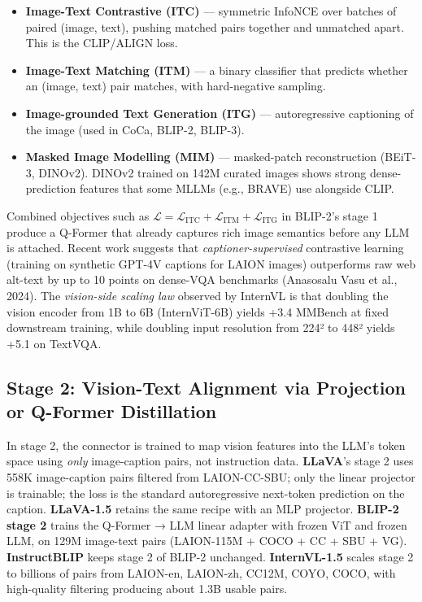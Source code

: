 \documentclass{article}
\begin{document}
\begin{itemize}

\item
  \textbf{Image-Text Contrastive (ITC)} --- symmetric InfoNCE over batches of paired (image, text), pushing matched pairs together and unmatched apart. This is the CLIP/ALIGN loss.
\item
  \textbf{Image-Text Matching (ITM)} --- a binary classifier that predicts whether an (image, text) pair matches, with hard-negative sampling.
\item
  \textbf{Image-grounded Text Generation (ITG)} --- autoregressive captioning of the image (used in CoCa, BLIP-2, BLIP-3).
\item
  \textbf{Masked Image Modelling (MIM)} --- masked-patch reconstruction (BEiT-3, DINOv2). DINOv2 \citep{oquab20232023} trained on 142M curated images shows strong dense-prediction features that some MLLMs (e.g., BRAVE) use alongside CLIP.
\end{itemize}

Combined objectives such as \(\mathcal{L} = \mathcal{L}_{\text{ITC}} + \mathcal{L}_{\text{ITM}} + \mathcal{L}_{\text{ITG}}\) in BLIP-2's stage 1 produce a Q-Former that already captures rich image semantics before any LLM is attached. Recent work suggests that \emph{captioner-supervised} contrastive learning (training on synthetic GPT-4V captions for LAION images) outperforms raw web alt-text by up to 10 points on dense-VQA benchmarks (Anasosalu Vasu et al., 2024). The \emph{vision-side scaling law} observed by InternVL \citep{chen20242024} is that doubling the vision encoder from 1B to 6B (InternViT-6B) yields +3.4 MMBench at fixed downstream training, while doubling input resolution from 224² to 448² yields +5.1 on TextVQA.

\subsection{Stage 2: Vision-Text Alignment via Projection or Q-Former Distillation}\label{stage-2-vision-text-alignment-via-projection-or-q-former-distillation}

In stage 2, the connector is trained to map vision features into the LLM's token space using \emph{only} image-caption pairs, not instruction data. \textbf{LLaVA}'s stage 2 uses 558K image-caption pairs filtered from LAION-CC-SBU; only the linear projector is trainable; the loss is the standard autoregressive next-token prediction on the caption. \textbf{LLaVA-1.5} retains the same recipe with an MLP projector. \textbf{BLIP-2 stage 2} trains the Q-Former → LLM linear adapter with frozen ViT and frozen LLM, on 129M image-text pairs (LAION-115M + COCO + CC + SBU + VG). \textbf{InstructBLIP} keeps stage 2 of BLIP-2 unchanged. \textbf{InternVL-1.5} scales stage 2 to billions of pairs from LAION-en, LAION-zh, CC12M, COYO, COCO, with high-quality filtering producing about 1.3B usable pairs.
\end{document}
